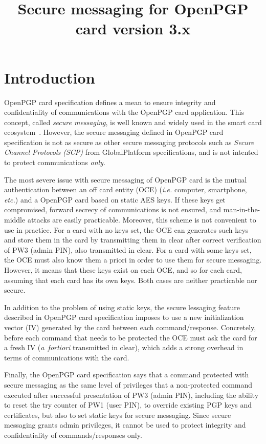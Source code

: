 \documentclass[dvipdfmx,11pt,a4paper,english,final]{article}
\title{Secure messaging for OpenPGP card version 3.x}
\newcommand{\ie}[0]{\textit{i.e.}\xspace}
\newcommand{\etc}[0]{\textit{etc.}\xspace}
\newcommand{\afortiori}[0]{\textit{a~fortiori}\xspace}
\newcommand{\gp}[0]{Glo\-bal\-Plat\-form\xspace}
\begin{document}
\maketitle

\section*{Introduction}

OpenPGP card specification\cite{openpgp-card} defines a mean to ensure
integrity and confidentiality of communications with the OpenPGP card
application. This concept, called \emph{secure messaging}, is well
known and widely used in the smart card ecosystem~\cite{iso7816-4,
  gp-card}. However, the secure messaging defined in OpenPGP card
specification is not as secure as other secure messaging protocols
such as \emph{Secure Channel Protocols (SCP)} from \gp
specifications, and is not intented to protect communications
\emph{only}.

The most severe issue with secure messaging of OpenPGP card is the
mutual authentication between an off card entity (OCE) (\ie
computer, smartphone, \etc) and a OpenPGP card based on static AES
keys. If these keys get compromised, forward secrecy of communications
is not ensured, and man-in-the-middle attacks are easily
practicable. Moreover, this scheme is not convenient to use in
practice.  For a card with no keys set, the OCE can generates such
keys and store them in the card by transmitting them in clear after
correct verification of PW3 (admin PIN), also transmitted in
clear. For a card with some keys set, the OCE must also know them a
priori in order to use them for secure messaging.  However, it means
that these keys exist on each OCE, and so for each card, assuming that
each card has its own keys. Both cases are neither practicable nor
secure.

In addition to the problem of using static keys, the secure lessaging
feature described in OpenPGP card specification imposes to use a new
initialization vector (IV) generated by the card between each
command/response. Concretely, before each command that needs to be
protected the OCE must ask the card for a fresh IV (\afortiori
transmitted in clear), which adds a strong overhead in terms of
communications with the card.

Finally, the OpenPGP card specification says that a command protected
with secure messaging as the same level of privileges that a
non-protected command executed after successful presentation of PW3
(admin PIN), including the ability to reset the try counter of PW1
(user PIN), to override existing PGP keys and certificates, but also
to set static keys for secure messaging. Since secure messaging grants
admin privileges, it cannot be used to protect integrity and
confidentiality of commands/responses only.
\end{document}
